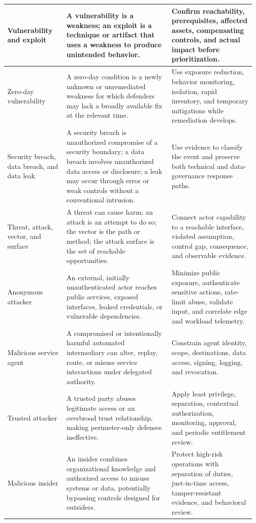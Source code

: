\documentclass[11pt]{article}
\begin{document}
\begin{longtable}{@{}>{\RaggedRight\arraybackslash}p{}>{\RaggedRight\arraybackslash}p{}>{\RaggedRight\arraybackslash}p{}@{}}
Vulnerability and exploit & A vulnerability is a weakness; an exploit is a technique or artifact that uses a weakness to produce unintended behavior. & Confirm reachability, prerequisites, affected assets, compensating controls, and actual impact before prioritization. \\\midrule
Zero-day vulnerability & A zero-day condition is a newly unknown or unremediated weakness for which defenders may lack a broadly available fix at the relevant time. & Use exposure reduction, behavior monitoring, isolation, rapid inventory, and temporary mitigations while remediation develops. \\\midrule
Security breach, data breach, and data leak & A security breach is unauthorized compromise of a security boundary; a data breach involves unauthorized data access or disclosure; a leak may occur through error or weak controls without a conventional intrusion. & Use evidence to classify the event and preserve both technical and data-governance response paths. \\\midrule
Threat, attack, vector, and surface & A threat can cause harm; an attack is an attempt to do so; the vector is the path or method; the attack surface is the set of reachable opportunities. & Connect actor capability to a reachable interface, violated assumption, control gap, consequence, and observable evidence. \\\midrule
Anonymous attacker & An external, initially unauthenticated actor reaches public services, exposed interfaces, leaked credentials, or vulnerable dependencies. & Minimize public exposure, authenticate sensitive actions, rate-limit abuse, validate input, and correlate edge and workload telemetry. \\\midrule
Malicious service agent & A compromised or intentionally harmful automated intermediary can alter, replay, route, or misuse service interactions under delegated authority. & Constrain agent identity, scope, destinations, data access, signing, logging, and revocation. \\\midrule
Trusted attacker & A trusted party abuses legitimate access or an overbroad trust relationship, making perimeter-only defenses ineffective. & Apply least privilege, separation, contextual authorization, monitoring, approval, and periodic entitlement review. \\\midrule
Malicious insider & An insider combines organizational knowledge and authorized access to misuse systems or data, potentially bypassing controls designed for outsiders. & Protect high-risk operations with separation of duties, just-in-time access, tamper-resistant evidence, and behavioral review. \\\midrule

\end{longtable}
\end{document}
